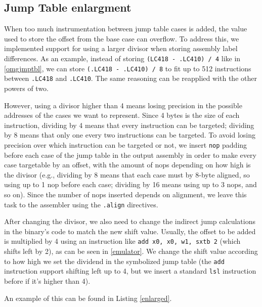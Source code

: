 \documentclass[a4paper,11pt,oneside]{report}
\begin{document}
\subsection{Jump Table enlargment}

When too much instrumentation between jump table cases is added, the value used
to store the offset from the base case can overflow. To address this, we
implemented support for using a larger divisor when storing assembly label
differences.  As an example, instead of storing \texttt{(LC418 - .LC410) / 4}
like in \autoref{omgjmptbl}, we can store \texttt{(.LC418 - .LC410) / 8} to fit
up to 512 instructions between \texttt{.LC418} and \texttt{.LC410}. The same reasoning
can be reapplied with the other powers of two. 

However, using a divisor higher than 4 means losing precision in the possible
addresses of the cases we want to represent. Since 4 bytes is the size of each
instruction, dividing by 4 means that every instruction can be targeted;
dividing by 8 means that only one every two instructions can be targeted. To
avoid losing precision over which instruction can be targeted or not, we insert
\texttt{nop} padding before each case of the jump table in the output assembly
in order to make every case targetable by an offset, with the amount of nops
depending on how high is the divisor (e.g., dividing by 8 means that each case
must by 8-byte aligned, so using up to 1 nop before each case; dividing by 16
means using up to 3 nops, and so on). Since the number of nops inserted depends on 
alignment, we leave this task to the assembler using the \texttt{.align} directives.

After changing the divisor, we also need to change the indirect jump calculations in the
binary's code to match the new shift value. Usually, the offset to be added is multiplied by
4 using an instruction like \texttt{add x0, x0, w1, sxtb 2} (which shifts left by 2), as
can be seen in \autoref{emulator}. We change the shift value according to how high we set
the dividend in the symbolized jump table (the \texttt{add} instruction support shifting left
up to 4, but we insert a standard \texttt{lsl} instruction before if it's higher than 4). 

An example of this can be found in Listing \ref{enlarged}.
\end{document}
